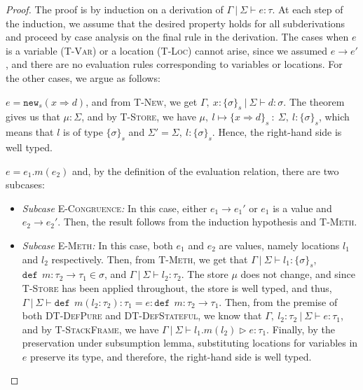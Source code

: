 \documentclass{llncs}
\newcommand{\keywadj}[1]{\mathtt{#1}}
\newcommand{\keyw}[1]{\keywadj{#1}~}
\newcommand{\pcase}[1][]{
  \if\relax\detokenize{#1}\relax
    \def\thiscase{}
  \else
    \def\thiscase{~#1}
  \fi
  \item
}
\begin{document}
\begin{proof} The proof is by induction on a derivation of $\Gamma~|~\Sigma \vdash e : \tau$. At each step of the induction, we assume that the desired property holds for all subderivations and proceed by case analysis on the final rule in the derivation. The cases when $e$ is a variable (\textsc{T-Var}) or a location (\textsc{T-Loc}) cannot arise, since we assumed $e \longrightarrow e'$, and there are no evaluation rules corresponding to variables or locations. For the other cases, we argue as follows:

\begin{pcases}
\pcase[\textsc{T-New}]
$e = \keywadj{new}_{s}(x \Rightarrow d)$, and from \textsc{T-New}, we get $\Gamma,~x : \{ \sigma \}_{s}~|~\Sigma \vdash d : \sigma$. The theorem gives us that $\mu : \Sigma$, and by \textsc{T-Store}, we have $\mu,~l \mapsto \{ x \Rightarrow d \}_s~:~\Sigma,~l : \{ \sigma \}_s$, which means that $l$ is of type $\{ \sigma \}_s$ and $\Sigma' = \Sigma,~l : \{ \sigma \}_s$. Hence, the right-hand side is well typed.
\\
\pcase[\textsc{T-Meth}]
$e = e_1.m(e_2)$ and, by the definition of the evaluation relation, there are two subcases:
\\
\begin{itemize}
\item[]  \textit{Subcase} \textsc{E-Congruence}\textit{:} In this case, either $e_1 \longrightarrow e_1'$ or $e_1$ is a value and $e_2 \longrightarrow e_2'$. Then, the result follows from the induction hypothesis and \textsc{T-Meth}.
\\
\item[]  \textit{Subcase} \textsc{E-Meth}\textit{:} In this case, both $e_1$ and $e_2$ are values, namely locations $l_1$ and $l_2$ respectively. Then, from \textsc{T-Meth}, we get that $\Gamma~|~\Sigma \vdash l_1 : \{\sigma\}_s$, $\keyw{def}~ m : \tau_2 \rightarrow \tau_1 \in \sigma$, and $\Gamma~|~\Sigma \vdash l_2 : \tau_2$. The store $\mu$ does not change, and since \textsc{T-Store} has been applied throughout, the store is well typed, and thus, \mbox{$\Gamma~|~\Sigma \vdash \keyw{def}~ m(l_2 : \tau_2) : \tau_1 = e : \keyw{def}~ m : \tau_2 \rightarrow \tau_1$}. Then, from the premise of both \textsc{DT-DefPure} and \textsc{DT-DefStateful}, we know that $\Gamma,~l_2 : \tau_2~|~\Sigma \vdash e : \tau_1$, and by \textsc{T-StackFrame}, we have $\Gamma~|~\Sigma \vdash l_1.m(l_2) \rhd e : \tau_1$. Finally, by the preservation under subsumption lemma, substituting locations for variables in $e$ preserve its type, and therefore, the right-hand side is well typed.
\\
\end{itemize}


\end{pcases}
\end{proof}
\end{document}
